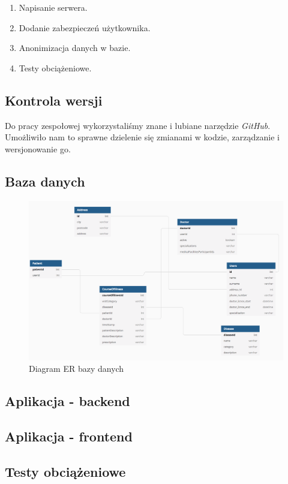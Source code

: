 \begin{enumerate}
    \item Napisanie serwera.
    \item Dodanie zabezpieczeń użytkownika.
    \item Anonimizacja danych w bazie.
    \item Testy obciążeniowe.
\end{enumerate}

\subsection{Kontrola wersji}
Do pracy zespołowej wykorzystaliśmy znane i lubiane narzędzie \textit{GitHub}. Umożliwiło nam to sprawne dzielenie się zmianami w kodzie, zarządzanie i wersjonowanie go.

\subsection{Baza danych}
\begin{figure}[H]
\centering
\includegraphics[width=15cm]{pictures/diagram}
\caption{Diagram ER bazy danych}
\end{figure}

\subsection{Aplikacja - backend}


\subsection{Aplikacja - frontend}


\subsection{Testy obciążeniowe}


